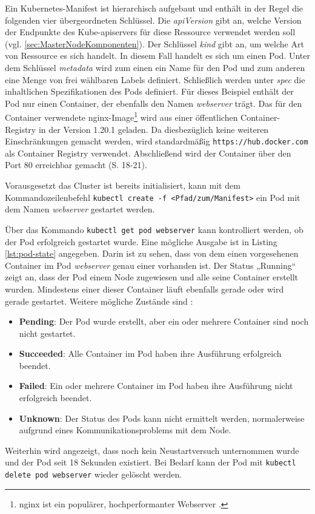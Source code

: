 \documentclass[11pt,a4paper]{article}
\begin{document}
Ein Kubernetes-Manifest ist hierarchisch aufgebaut
und enthält in der Regel die folgenden vier übergeordneten Schlüssel.
Die \emph{apiVersion} gibt an, welche Version der Endpunkte des Kube-apiservers für diese Ressource
verwendet werden soll (vgl. \ref{sec:MasterNodeKomponenten}).
Der Schlüssel \emph{kind} gibt an, um welche Art von Ressource es sich handelt.
In diesem Fall handelt es sich um einen Pod.
Unter dem Schlüssel \emph{metadata} wird zum einen ein Name für den Pod
und zum anderen eine Menge von frei wählbaren Labels definiert.
Schließlich werden unter \emph{spec} die inhaltlichen Spezifikationen des Pods
definiert. Für dieses Beispiel enthält der Pod nur einen Container, der ebenfalls den Namen
\emph{webserver} trägt. Das für den Container verwendete
nginx-Image\footnote{nginx ist ein populärer, hochperformanter Webserver \cite{nginx}.} wird aus einer
öffentlichen Container-Registry in der Version 1.20.1 geladen. Da diesbezüglich keine weiteren
Einschränkungen gemacht werden, wird standardmäßig \linebreak \lstinline|https://hub.docker.com| als Container Registry
verwendet. Abschließend wird der Container über den Port 80 erreichbar gemacht \cite{Schmeling_Dargatz_2022} (S. 18-21).

Vorausgesetzt das Cluster ist bereits initialisiert, kann mit dem Kommandozeilenbefehl
\lstinline|kubectl create -f <Pfad/zum/Manifest>|
ein Pod mit dem Namen \emph{webserver} gestartet werden.

Über das Kommando \lstinline|kubectl get pod webserver| kann kontrolliert werden,
ob der Pod erfolgreich gestartet wurde. Eine mögliche Ausgabe ist in
Listing \ref{lst:pod-state} angegeben. Darin ist zu sehen, dass
von dem einen vorgesehenen Container im Pod \emph{webserver} genau einer vorhanden ist.
Der Status „Running“ zeigt an, dass der Pod einem Node zugewiesen und alle seine Container erstellt wurden.
Mindestens einer dieser Container läuft ebenfalls gerade oder wird gerade gestartet.
Weitere mögliche Zustände sind \cite{kubernetes.io_pod_lifecycle}:
\begin{itemize}
  \item \textbf{Pending}: Der Pod wurde erstellt, aber ein oder mehrere Container sind noch nicht gestartet.
  \item \textbf{Succeeded}: Alle Container im Pod haben ihre Ausführung erfolgreich beendet.
  \item \textbf{Failed}: Ein oder mehrere Container im Pod haben ihre Ausführung nicht erfolgreich beendet.
  \item \textbf{Unknown}: Der Status des Pods kann nicht ermittelt werden, normalerweise aufgrund eines Kommunikationsproblems mit dem Node.
\end{itemize}
Weiterhin wird angezeigt, dass noch kein Neustartversuch unternommen wurde
und der Pod seit 18 Sekunden existiert.
Bei Bedarf kann der Pod mit \lstinline|kubectl delete pod webserver| wieder gelöscht werden.
\end{document}
